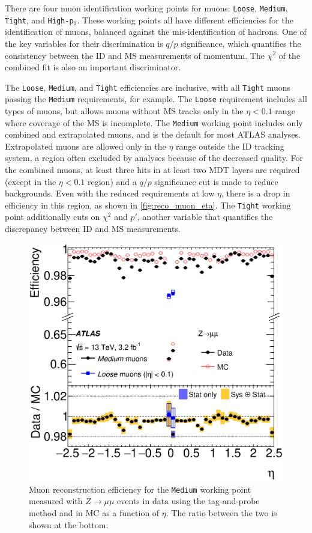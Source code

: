 There are four muon identification working points for muons: \texttt{Loose}, \texttt{Medium}, \texttt{Tight}, and \texttt{High-p$_\texttt{T}$}. These working points all have different efficiencies for the identification of muons, balanced against the mis-identification of hadrons. One of the key variables for their discrimination is $q/p$ significance, which quantifies the consistency between the \ac{ID} and \ac{MS} measurements of momentum. The $\chi^2$ of the combined fit is also an important discriminator. 

The \texttt{Loose}, \texttt{Medium}, and \texttt{Tight} efficiencies are inclusive, with all \texttt{Tight} muons passing the \texttt{Medium} requirements, for example. The \texttt{Loose} requirement includes all types of muons, but allows muons without \ac{MS} tracks only in the $\eta<0.1$ range where coverage of the \ac{MS} is incomplete. The \texttt{Medium} working point includes only combined and extrapolated muons, and is the default for most ATLAS analyses. Extrapolated muons are allowed only in the $\eta$ range outside the \ac{ID} tracking system, a region often excluded by analyses because of the decreased quality. For the combined muons, at least three hits in at least two \ac{MDT} layers are required (except in the $\eta<0.1$ region) and a $q/p$ significance cut is made to reduce backgrounds. Even with the reduced requirements at low $\eta$, there is a drop in efficiency in this region, as shown in \autoref{fig:reco_muon_eta}. The \texttt{Tight} working point additionally cuts on $\chi^2$ and $p'$, another variable that quantifies the discrepancy between \ac{ID} and \ac{MS} \pt measurements. 

\begin{centering}
\begin{figure}[!hbt]
\myfloatalign
\includegraphics[width=.9\linewidth]{figures/reco/fig_03a.eps}
\caption{Muon reconstruction efficiency for the \texttt{Medium} working point measured with $Z\rightarrow\mu\mu$ events in data using the tag-and-probe method and in \ac{MC} as a function of $\eta$. The ratio between the two is shown at the bottom. \cite{1603.05598} }
\label{fig:reco_muon_eta}
\end{figure}
\end{centering}


